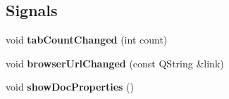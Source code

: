 \subsection*{Signals}
\begin{DoxyCompactItemize}
\item 
\hypertarget{classTabbedBrowser_a9c87d05e2cfcb60fcede171c9350bda4}{
void {\bfseries tabCountChanged} (int count)}
\label{classTabbedBrowser_a9c87d05e2cfcb60fcede171c9350bda4}

\item 
\hypertarget{classTabbedBrowser_aa5c5f94b05a28922487f72352fc53d65}{
void {\bfseries browserUrlChanged} (const QString \&link)}
\label{classTabbedBrowser_aa5c5f94b05a28922487f72352fc53d65}

\item 
\hypertarget{classTabbedBrowser_adccbf7355719d6a5c7f28752342266db}{
void {\bfseries showDocProperties} ()}
\label{classTabbedBrowser_adccbf7355719d6a5c7f28752342266db}

\end{DoxyCompactItemize}
